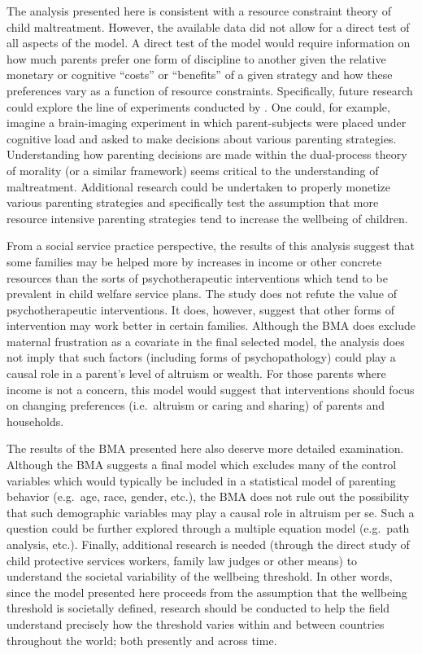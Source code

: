 The analysis presented here is consistent with a resource constraint
theory of child maltreatment. However, the available data did not allow
for a direct test of all aspects of the model. A direct test of the
model would require information on how much parents prefer one form of
discipline to another given the relative monetary or cognitive ``costs''
or ``benefits'' of a given strategy and how these preferences vary as a
function of resource constraints. Specifically, future research could
explore the line of experiments conducted by \citet{Greene2014}. One
could, for example, imagine a brain-imaging experiment in which
parent-subjects were placed under cognitive load and asked to make
decisions about various parenting strategies. Understanding how
parenting decisions are made within the dual-process theory of morality
(or a similar framework) seems critical to the understanding of
maltreatment. Additional research could be undertaken to properly
monetize various parenting strategies and specifically test the
assumption that more resource intensive parenting strategies tend to
increase the wellbeing of children.

From a social service practice perspective, the results of this analysis suggest that
some families may be helped more by increases in income or other
concrete resources than the sorts of psychotherapeutic interventions
which tend to be prevalent in child welfare service plans. The study
does not refute the value of psychotherapeutic interventions. It does,
however, suggest that other forms of intervention may work better in
certain families. Although the BMA does exclude maternal frustration as
a covariate in the final selected model, the analysis does not imply
that such factors (including forms of psychopathology) could play a
causal role in a parent's level of altruism or wealth. For those parents where
income is not a concern, this model would suggest that interventions
should focus on changing preferences (i.e.~altruism or caring and
sharing) of parents and households.

The results of the BMA presented here also deserve more detailed
examination. Although the BMA suggests a final model which excludes many
of the control variables which would typically be included in a
statistical model of parenting behavior (e.g.~age, race, gender, etc.),
the BMA does not rule out the possibility that such demographic
variables may play a causal role in altruism per se. Such a question
could be further explored through a multiple equation model (e.g.~path
analysis, etc.). Finally, additional research is needed (through the
direct study of child protective services workers, family law judges or other means) to understand the
societal variability of the wellbeing threshold. In other words, since
the model presented here proceeds from the assumption that the wellbeing
threshold is societally defined, research should be conducted to help
the field understand precisely how the threshold varies within and
between countries throughout the world; both presently and across time.


